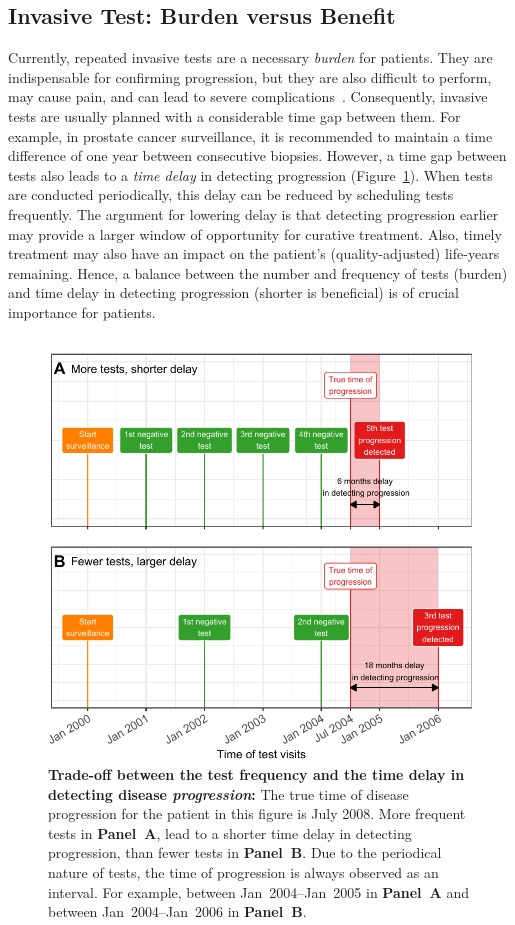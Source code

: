 \subsection{Invasive Test: Burden versus Benefit}
Currently, repeated invasive tests are a necessary \emph{burden} for patients. They are indispensable for confirming progression, but they are also difficult to perform, may cause pain, and can lead to severe complications~\citep{loeb2013systematic,krist2007timing}. Consequently, invasive tests are usually planned with a considerable time gap between them. For example, in prostate cancer surveillance, it is recommended to maintain a time difference of one year between consecutive biopsies. However, a time gap between tests also leads to a \emph{time delay} in detecting progression (Figure~\ref{c1:fig:1}). When tests are conducted periodically, this delay can be reduced by scheduling tests frequently. The argument for lowering delay is that detecting progression earlier may provide a larger window of opportunity for curative treatment. Also, timely treatment may also have an impact on the patient's (quality-adjusted) life-years remaining. Hence, a balance between the number and frequency of tests (burden) and time delay in detecting progression (shorter is beneficial) is of crucial importance for patients.

\begin{figure}[tbp]
\includegraphics{contents/c1/images/c1_fig1.pdf}
\caption{\textbf{Trade-off between the test frequency and the time delay in detecting disease \emph{progression}:} The true time of disease progression for the patient in this figure is July 2008. More frequent tests in \textbf{Panel~A}, lead to a shorter time delay in detecting progression, than fewer tests in \textbf{Panel~B}. Due to the periodical nature of tests, the time of progression is always observed as an interval. For example, between Jan~2004--Jan~2005 in \textbf{Panel~A} and between Jan~2004--Jan~2006 in \textbf{Panel~B}.}
\label{c1:fig:1}
\end{figure}

